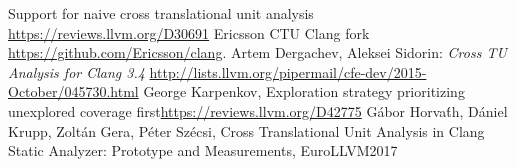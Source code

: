 \documentclass[sigconf]{acmart}
\begin{document}

\begin{thebibliography}{9}
 Support for naive cross translational unit analysis \url{https://reviews.llvm.org/D30691}
 Ericsson CTU Clang fork \url{https://github.com/Ericsson/clang}.
 Artem Dergachev, Aleksei Sidorin: \emph{Cross TU Analysis for Clang 3.4}
  \url{http://lists.llvm.org/pipermail/cfe-dev/2015-October/045730.html}
 George Karpenkov, Exploration strategy prioritizing unexplored coverage first\url{https://reviews.llvm.org/D42775}
 G\'abor Horva\'th, D\'aniel Krupp, Zolt\'an Gera, P\'eter Sz\'ecsi, Cross Translational Unit Analysis in Clang Static Analyzer: Prototype and Measurements, EuroLLVM2017
\end{thebibliography}
\end{document}
